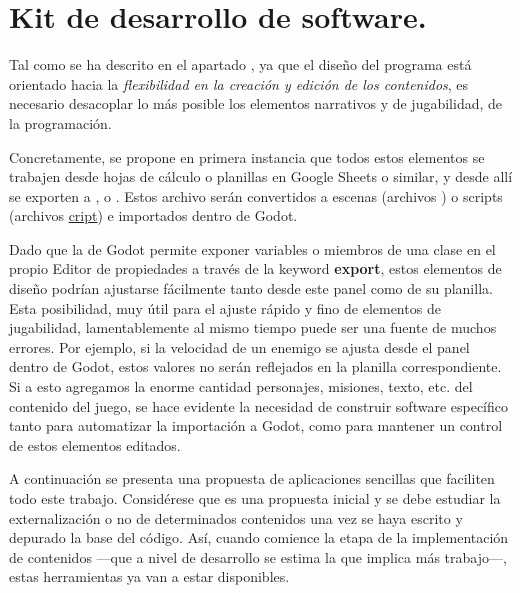 
\section{Kit de desarrollo de software.}\label{kit:kit-de-desarrollo}

Tal como se ha descrito en el apartado , ya que el diseño del programa está orientado hacia la \emph{flexibilidad en la creación y edición de los contenidos}, es necesario desacoplar lo más posible los elementos narrativos y de jugabilidad, de la programación.

Concretamente, se propone en primera instancia que todos estos elementos se trabajen desde hojas de cálculo o planillas en Google Sheets o similar, y desde allí se exporten a ,  o . Estos archivo serán convertidos a escenas (archivos \href{https://docs.godotengine.org/es/stable/development/file_formats/tscn.html}{}) o scripts (archivos \href{https://docs.godotengine.org/es/stable/development/file_formats/gdscript_grammar.html}{cript}) e importados dentro de Godot.

Dado que la  de Godot permite exponer variables o miembros de una clase en el propio Editor de propiedades a través de la keyword \textbf{export}, estos elementos de diseño podrían ajustarse fácilmente tanto desde este panel como de su planilla. Esta posibilidad, muy útil para el ajuste rápido y fino de elementos de jugabilidad, lamentablemente al mismo tiempo puede ser una fuente de muchos errores. Por ejemplo, si la velocidad de un enemigo se ajusta desde el panel dentro de Godot, estos valores no serán reflejados en la planilla correspondiente. Si a esto agregamos la enorme cantidad personajes, misiones, texto, etc. del contenido del juego, se hace evidente la necesidad de construir software específico tanto para automatizar la importación a Godot, como para mantener un control de estos elementos editados.

A continuación se presenta una propuesta de aplicaciones sencillas que faciliten todo este trabajo. Considérese que es una propuesta inicial y se debe estudiar la externalización o no de determinados contenidos una vez se haya escrito y depurado la base del código. Así, cuando comience la etapa de la implementación de contenidos ---que a nivel de desarrollo se estima la que implica más trabajo---, estas herramientas ya van a estar disponibles.

